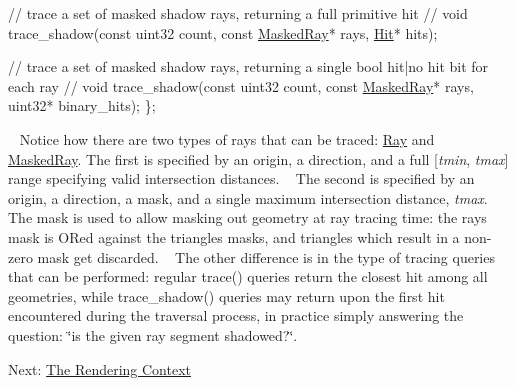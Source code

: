 \begin{DoxyParagraph}{}
\begin{DoxyCode}
   \textcolor{comment}{// trace a set of masked shadow rays, returning a full primitive hit}
   \textcolor{comment}{//}
   \textcolor{keywordtype}{void} trace\_shadow(\textcolor{keyword}{const} uint32 count, \textcolor{keyword}{const} \hyperlink{struct_masked_ray}{MaskedRay}* rays, \hyperlink{struct_hit}{Hit}* hits);

   \textcolor{comment}{// trace a set of masked shadow rays, returning a single bool hit|no hit bit for each ray}
   \textcolor{comment}{//}
   \textcolor{keywordtype}{void} trace\_shadow(\textcolor{keyword}{const} uint32 count, \textcolor{keyword}{const} \hyperlink{struct_masked_ray}{MaskedRay}* rays, uint32* binary\_hits);
\};
\end{DoxyCode}
 ~\newline
 Notice how there are two types of rays that can be traced\+: \hyperlink{struct_ray}{Ray} and \hyperlink{struct_masked_ray}{Masked\+Ray}. The first is specified by an origin, a direction, and a full \mbox{[}{\itshape tmin}, {\itshape tmax}\mbox{]} range specifying valid intersection distances. ~\newline
 The second is specified by an origin, a direction, a mask, and a single maximum intersection distance, {\itshape tmax}. The mask is used to allow masking out geometry at ray tracing time\+: the ray\textquotesingle{}s mask is OR\textquotesingle{}ed against the triangles masks, and triangles which result in a non-\/zero mask get discarded. ~\newline
 The other difference is in the type of tracing queries that can be performed\+: regular trace() queries return the closest hit among all geometries, while trace\+\_\+shadow() queries may return upon the first hit encountered during the traversal process, in practice simply answering the question\+: \char`\"{}is the given ray segment shadowed?\char`\"{}.
\end{DoxyParagraph}
Next\+: \hyperlink{_rendering_context_page}{The Rendering Context} 